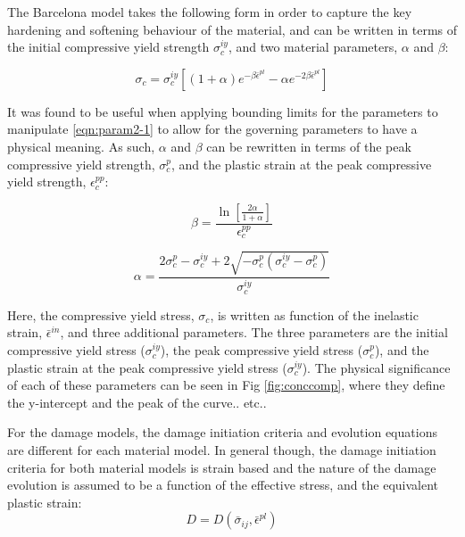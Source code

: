 The Barcelona model takes the following form in order to capture the key hardening and softening behaviour of the material, and can be written in terms of the initial compressive yield strength $\sigma_c^{iy}$, and two material parameters, $\alpha$ and $\beta$:

\begin{equation}
\sigma_c=\sigma_c^{iy}\left [ \left ( 1+\alpha \right ) e^{-\beta\bar{\epsilon}^{pl}}-\alpha e^{-2\beta\bar{\epsilon}^{pl}}  \right ]
\label{eqn:param2-1}
\end{equation}

It was found to be useful when applying bounding limits for the parameters to manipulate \ref{eqn:param2-1} to allow for the governing parameters to have a physical meaning. As such, $\alpha$ and $\beta$ can be rewritten in terms of the peak compressive yield strength, $\sigma_{c}^{p}$, and the plastic strain at the peak compressive yield strength, $\epsilon_c^{pp}$:

\begin{equation}
\beta=\frac{\ln\left[\frac{2\alpha}{1+\alpha} \right ]}{\epsilon_c^{pp}}
\label{eqn:param2-2}
\end{equation}

\begin{equation}
\alpha =\frac{2\sigma_c^{p}-\sigma_c^{iy}+2\sqrt{-\sigma_c^p\left(\sigma_c^{iy}-\sigma_c^p \right )}}{\sigma_c^{iy}}
\label{eqn:param2-3}
\end{equation}

Here, the compressive yield stress, $\sigma_{c}$, is written as function
of the inelastic strain, $\bar{\epsilon}^{in}$, and three additional
parameters. The three parameters are the initial compressive yield
stress ($\sigma_{c}^{iy}$), the peak compressive yield stress ($\sigma_{c}^{p}$),
and the plastic strain at the peak compressive yield stress ($\sigma_{c}^{iy}$).
The physical significance of each of these parameters can be seen
in Fig \ref{fig:conccomp}, where they define the y-intercept and the peak of the curve..
etc..

For the damage models, the damage initiation criteria and evolution equations are different for each material model. In general though, the damage initiation criteria for both material models is strain based and the nature of the damage evolution is assumed to be a function of the effective stress, and the equivalent plastic strain:
\begin{equation}
D=D\left(\bar{\sigma}_{ij},\bar{\epsilon}^{pl}\right)\label{eqn:const8}
\end{equation}


